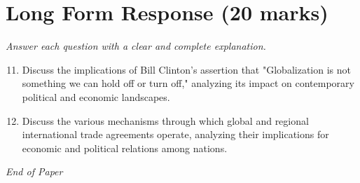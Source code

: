 \documentclass[12pt]{article}
\begin{document}
\section*{Long Form Response (20 marks)}
\textit{Answer each question with a clear and complete explanation.}
\begin{enumerate}[label=\arabic*.]
\setcounter{enumi}{10}
\item Discuss the implications of Bill Clinton's assertion that "Globalization is not something we can hold off or turn off," analyzing its impact on contemporary political and economic landscapes.
\item Discuss the various mechanisms through which global and regional international trade agreements operate, analyzing their implications for economic and political relations among nations.
\end{enumerate}

\vfill
\noindent\textit{End of Paper}
\end{document}
